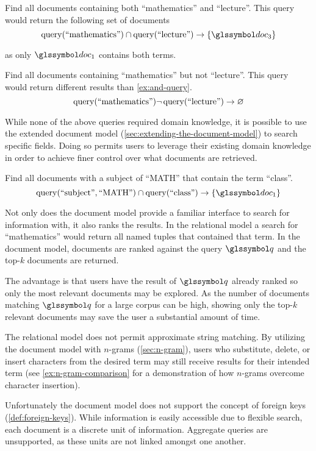 		\begin{ex}
		\label{ex:and-query}
			Find all documents containing both ``mathematics'' and ``lecture''.  This query would return the following set of documents
			\[
				\query(\text{``mathematics''}) \cap \query(\text{``lecture''}) \rightarrow \{\doc_3\}
			\]
			
			as only \(\doc_1\) contains both terms.
		\end{ex}
		
		\begin{ex}
			Find all documents containing ``mathematics'' but not ``lecture''.  This query would return different results than \vref{ex:and-query}.
			\[
				\operatorname{query}(\text{``mathematics''})\neg\operatorname{query}(\text{``lecture''}) \rightarrow \varnothing
			\]
		\end{ex}
		
		While none of the above queries required domain knowledge, it is possible to use the extended document model (\vref{sec:extending-the-document-model}) to search specific fields.  Doing so permits users to leverage their existing domain knowledge in order to achieve finer control over what documents are retrieved.
		
		\begin{ex}
		\label{ex:extended-query}
			Find all documents with a subject of ``MATH'' that contain the term ``class''.
			\[
				\query(\text{``subject''}, \text{``MATH''}) \cap \query(\text{``class''}) \rightarrow \{\doc_1\}
			\]
		\end{ex}
		
		Not only does the document model provide a familiar interface to search for information with, it also ranks the results.  In the relational model a search for ``mathematics'' would return all named tuples that contained that term.  In the document model, documents are ranked against the query \(\q\) and the top-\(k\) documents are returned.
		
		The advantage is that users have the result of \(\q\) already ranked so only the most relevant documents may be explored.	 As the number of documents matching \(\q\) for a large corpus can be high, showing only the top-\(k\) relevant documents may save the user a substantial amount of time.
		
		The relational model does not permit approximate string matching.  By utilizing the document model with \(n\)-grams (\vref{sec:n-gram}), users who substitute, delete, or insert characters from the desired term may still receive results for their intended term (see \vref{ex:n-gram-comparison} for a demonstration of how \(n\)-grams overcome character insertion).
		
		Unfortunately the document model does not support the concept of foreign keys (\vref{def:foreign-keys}).  While information is easily accessible due to flexible search, each document is a discrete unit of information.  Aggregate queries are unsupported, as these units are not linked amongst one another.